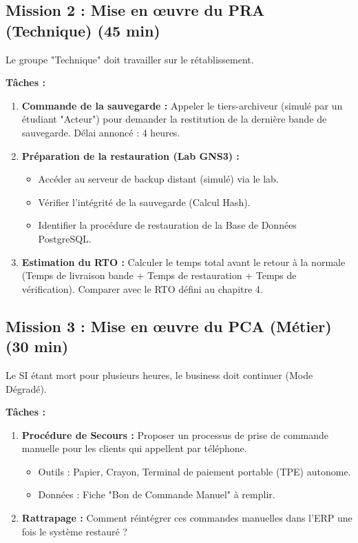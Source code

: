 \subsection{Mission 2 : Mise en œuvre du PRA (Technique) (45 min)}

Le groupe "Technique" doit travailler sur le rétablissement.

\textbf{Tâches :}
\begin{enumerate}
    \item \textbf{Commande de la sauvegarde :} Appeler le tiers-archiveur (simulé par un étudiant "Acteur") pour demander la restitution de la dernière bande de sauvegarde. Délai annoncé : 4 heures.
    \item \textbf{Préparation de la restauration (Lab GNS3) :}
    \begin{itemize}
        \item Accéder au serveur de backup distant (simulé) via le lab.
        \item Vérifier l'intégrité de la sauvegarde (Calcul Hash).
        \item Identifier la procédure de restauration de la Base de Données PostgreSQL.
    \end{itemize}
    \item \textbf{Estimation du RTO :} Calculer le temps total avant le retour à la normale (Temps de livraison bande + Temps de restauration + Temps de vérification). Comparer avec le RTO défini au chapitre 4.
\end{enumerate}

\subsection{Mission 3 : Mise en œuvre du PCA (Métier) (30 min)}

Le SI étant mort pour plusieurs heures, le business doit continuer (Mode Dégradé).

\textbf{Tâches :}
\begin{enumerate}
    \item \textbf{Procédure de Secours :} Proposer un processus de prise de commande manuelle pour les clients qui appellent par téléphone.
    \begin{itemize}
        \item Outils : Papier, Crayon, Terminal de paiement portable (TPE) autonome.
        \item Données : Fiche "Bon de Commande Manuel" à remplir.
    \end{itemize}
    \item \textbf{Rattrapage :} Comment réintégrer ces commandes manuelles dans l'ERP une fois le système restauré ?
\end{enumerate}

